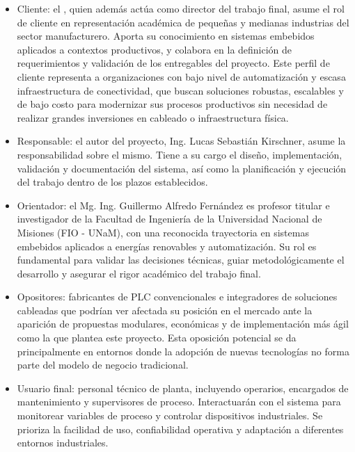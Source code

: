 \documentclass[
11pt, %
]{charter}
\begin{document}
\begin{itemize}
	\item Cliente: el \supname, quien además actúa como director del trabajo final, asume el rol de cliente en representación académica de pequeñas y medianas industrias del sector manufacturero. Aporta su conocimiento en sistemas embebidos aplicados a contextos productivos, y colabora en la definición de requerimientos y validación de los entregables del proyecto. Este perfil de cliente representa a organizaciones con bajo nivel de automatización y escasa infraestructura de conectividad, que buscan soluciones robustas, escalables y de bajo costo para modernizar sus procesos productivos sin necesidad de realizar grandes inversiones en cableado o infraestructura física.
	
	
	
	\item Responsable: el autor del proyecto, Ing. Lucas Sebastián Kirschner, asume la responsabilidad sobre el mismo. Tiene a su cargo el diseño, implementación, validación y documentación del sistema, así como la planificación y ejecución del trabajo dentro de los plazos establecidos.
	
	\item Orientador: el Mg. Ing. Guillermo Alfredo Fernández es profesor titular e investigador de la Facultad de Ingeniería de la Universidad Nacional de Misiones (FIO - UNaM), con una reconocida trayectoria en sistemas embebidos aplicados a energías renovables y automatización. Su rol es fundamental para validar las decisiones técnicas, guiar metodológicamente el desarrollo y asegurar el rigor académico del trabajo final.
	
	\item Opositores: fabricantes de PLC convencionales e integradores de soluciones cableadas que podrían ver afectada su posición en el mercado ante la aparición de propuestas modulares, económicas y de implementación más ágil como la que plantea este proyecto. Esta oposición potencial se da principalmente en entornos donde la adopción de nuevas tecnologías no forma parte del modelo de negocio tradicional.
	
	\item Usuario final: personal técnico de planta, incluyendo operarios, encargados de mantenimiento y supervisores de proceso. Interactuarán con el sistema para monitorear variables de proceso y controlar dispositivos industriales. Se prioriza la facilidad de uso, confiabilidad operativa y adaptación a diferentes entornos industriales.
\end{itemize}
\end{document}
